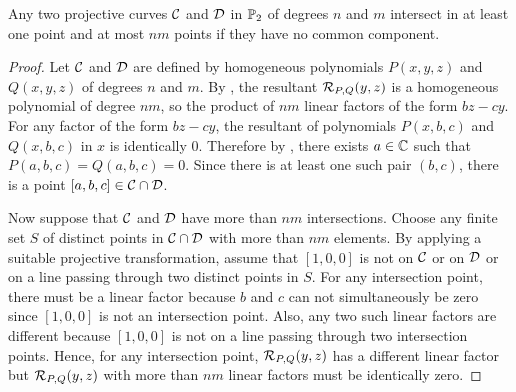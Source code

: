 \begin{theorem}\label{thm:weak_bezout}
    Any two projective curves $\mathcal C$ and $\mathcal D$ in $\mathbb P_2$ of degrees $n$ and $m$ intersect in at least one point and at most $nm$ points if they have no common component.
\end{theorem}

\begin{proof}
    Let $\mathcal C$ and $\mathcal D$ are defined by homogeneous polynomials $P(x,y,z)$ and $Q(x,y,z)$ of degrees $n$ and $m$. By , the resultant $\mathcal R_{P,Q}(y,z)$ is a homogeneous polynomial of degree $nm$, so the product of $nm$ linear factors of the form $bz-cy$. For any factor of the form $bz-cy$, the resultant of polynomials $P(x,b,c)$ and $Q(x,b,c)$ in $x$ is identically 0. Therefore by , there exists $a\in\mathbb C$ such that $P(a,b,c)=Q(a,b,c)=0$. Since there is at least one such pair $(b,c)$, there is a point $[a,b,c]\in\mathcal C\cap\mathcal D$.

    Now suppose that $\mathcal C$ and $\mathcal D$ have more than $nm$ intersections. Choose any finite set $S$ of distinct points in $\mathcal C\cap\mathcal D$ with more than $nm$ elements. By applying a suitable projective transformation, assume that $[1,0,0]$ is not on $\mathcal C$ or on $\mathcal D$ or on a line passing through two distinct points in $S$. For any intersection point, there must be a linear factor because $b$ and $c$ can not simultaneously be zero since $[1,0,0]$ is not an intersection point. Also, any two such linear factors are different because $[1,0,0]$ is not on a line passing through two intersection points. Hence, for any intersection point, $\mathcal R_{P,Q}(y,z)$ has a different linear factor but $\mathcal R_{P,Q}(y,z)$ with more than $nm$ linear factors must be identically zero.
\end{proof}

